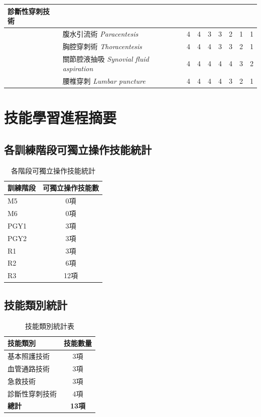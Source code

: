 \documentclass[a4paper,12pt]{article}
\begin{document}
\begin{longtable}{>{\raggedright}p{3cm}>{\raggedright\arraybackslash}p{4.5cm}ccccccc}
\textbf{診斷性穿刺技術} & & & & & & & & \\
\midrule
& 腹水引流術 \newline \textit{Paracentesis} & 4 & 4 & 3 & 3 & 2 & 1 & 1 \\
& 胸腔穿刺術 \newline \textit{Thoracentesis} & 4 & 4 & 4 & 3 & 3 & 2 & 1 \\
& 關節腔液抽吸 \newline \textit{Synovial fluid aspiration} & 4 & 4 & 4 & 4 & 4 & 3 & 2 \\
& 腰椎穿刺 \newline \textit{Lumbar puncture} & 4 & 4 & 4 & 4 & 3 & 2 & 1 \\

\end{longtable}

\vspace{1em}

\section*{技能學習進程摘要}

\subsection*{各訓練階段可獨立操作技能統計}

\begin{table}[h]
\centering
\begin{tabular}{lc}
\toprule
\textbf{訓練階段} & \textbf{可獨立操作技能數} \\
\midrule
M5 & 0項 \\
M6 & 0項 \\
PGY1 & 3項 \\
PGY2 & 3項 \\
R1 & 3項 \\
R2 & 6項 \\
R3 & 12項 \\
\bottomrule
\end{tabular}
\caption{各階段可獨立操作技能統計}
\end{table}

\subsection*{技能類別統計}

\begin{table}[h]
\centering
\begin{tabular}{lc}
\toprule
\textbf{技能類別} & \textbf{技能數量} \\
\midrule
基本照護技術 & 3項 \\
血管通路技術 & 3項 \\
急救技術 & 3項 \\
診斷性穿刺技術 & 4項 \\
\midrule
\textbf{總計} & \textbf{13項} \\
\bottomrule
\end{tabular}
\caption{技能類別統計表}
\end{table}
\end{document}
